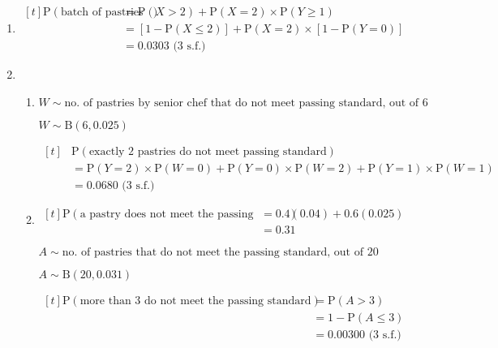 \documentclass[11pt,a4paper]{book}
\begin{document}
\begin{example}
\begin{enumerate}[label=(\alph*)]
\item
$
\begin{aligned}[t]
\text{P}\left(\text{batch of pastries is rejected}\right) & =\text{P}\left(X>2\right)+\text{P}\left(X=2\right)\times\text{P}\left(Y\geq1\right)\\
 & =\left[1-\text{P}\left(X\leq2\right)\right]+\text{P}\left(X=2\right)\times\left[1-\text{P}\left(Y=0\right)\right]\\
 & =0.0303\text{ (3 s.f.)}
\end{aligned}
$

\item
\begin{enumerate}[label=(\roman*)]

\item  $W\sim\text{no. of pastries by senior chef that do not meet passing standard, out of 6}$

$W\sim\text{B}\left(6,0.025\right)$

$
\begin{aligned}[t]
 & \text{P}\left(\text{exactly 2 pastries do not meet passing standard}\right)\\
 & =\text{P}\left(Y=2\right)\times\text{P}\left(W=0\right)+\text{P}\left(Y=0\right)\times\text{P}\left(W=2\right)+\text{P}\left(Y=1\right)\times\text{P}\left(W=1\right)\\
 & =0.0680\text{ (3 s.f.)}
\end{aligned}
$

\item
$
\begin{aligned}[t]
\text{P}\left(\text{a pastry does not meet the passing standard}\right) & =0.4\left(0.04\right)+0.6\left(0.025\right)\\
 & =0.31
\end{aligned}
$

$A\sim\text{no. of pastries that do not meet the passing standard, out of 20}$

$A\sim\text{B}\left(20,0.031\right)$

$
\begin{aligned}[t]
\text{P}\left(\text{more than 3 do not meet the passing standard}\right) & =\text{P}\left(A>3\right)\\
 & =1-\text{P}\left(A\leq3\right)\\
 & =0.00300\text{ (3 s.f.)}
\end{aligned}
$

\end{enumerate}

\end{enumerate}

\end{example}
\end{document}
